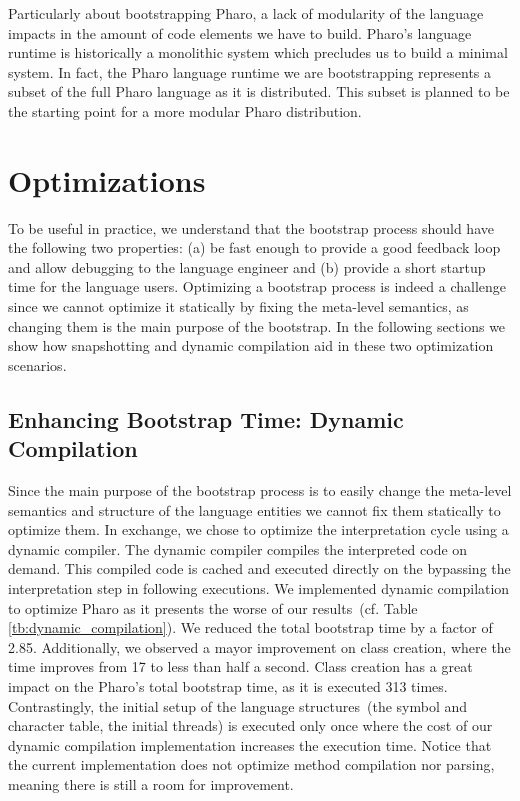 Particularly about bootstrapping Pharo, a lack of modularity of the language impacts in the amount of code elements we have to build. Pharo's language runtime is historically a monolithic system which precludes us to build a minimal system. In fact, the Pharo language runtime we are bootstrapping represents a subset of the full Pharo language as it is distributed. This subset is planned to be the starting point for a more modular Pharo distribution.

\section{Optimizations}\label{sec:optimisations}

To be useful in practice, we understand that the bootstrap process should have the following two properties: (a) be fast enough to provide a good feedback loop and allow debugging to the language engineer and (b) provide a short startup time for the language users. Optimizing a bootstrap process is indeed a challenge since we cannot optimize it statically by fixing the meta-level semantics, as changing them is the main purpose of the bootstrap. In the following sections we show how snapshotting and dynamic compilation aid in these two optimization scenarios. 

\subsection*{Enhancing Bootstrap Time: Dynamic Compilation}
Since the main purpose of the bootstrap process is to easily change the meta-level semantics and structure of the language entities we cannot fix them statically to optimize them. In exchange, we chose to optimize the interpretation cycle using a dynamic compiler. The dynamic compiler compiles the interpreted code on demand. This compiled code is cached and executed directly on the \VM bypassing the interpretation step in following executions. We implemented dynamic compilation to optimize Pharo as it presents the worse of our results~(cf. Table \ref{tb:dynamic_compilation}). We reduced the total bootstrap time by a factor of 2.85. Additionally, we observed a mayor improvement on class creation, where the time improves from 17 to less than half a second. Class creation has a great impact on the Pharo's total bootstrap time, as it is executed 313 times. Contrastingly, the initial setup of the language structures~(\eg the symbol and character table, the initial threads) is executed only once where the cost of our dynamic compilation implementation increases the execution time. Notice that the current implementation does not optimize method compilation nor parsing, meaning there is still a room for improvement.

